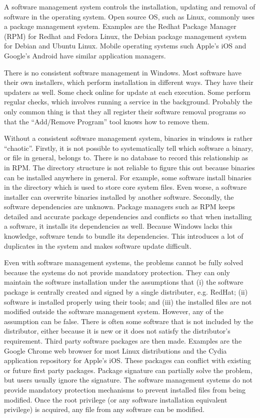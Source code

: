 A software management system controls the installation, updating and
removal of software in the operating system.
Open source OS, such as Linux, commonly uses a package management system.
Examples are the Redhat Package Manager (RPM) for Redhat and Fedora Linux,
the Debian package management system for Debian and Ubuntu Linux.
Mobile operating systems such Apple's iOS and Google's Android have
similar application managers.

There is no consistent software management in Windows.
Most software have their own installers, which perform installation in
different ways.
They have their updaters as well.
Some check online for update at each execution.
Some perform regular checks, which involves running
a service in the background.
Probably the only common thing is that they all register their software
removal programs so that the ``Add/Remove Program'' tool knows
how to remove them.

Without a consistent software management system, binaries in windows
is rather ``chaotic''.
Firstly, it is not possible to systematically tell which software a binary,
or file in general, belongs to.
There is no database to record this relationship as in RPM.
The directory structure is not reliable to figure this out because
binaries can be installed anywhere in general.
For example, some software install binaries in the 
directory which is used to store core system files.
Even worse, a software installer can overwrite binaries installed by another
software.
Secondly, the software dependencies are unknown.
Package managers such as RPM keeps detailed and accurate
package dependencies and conflicts
so that when installing a software, it installs its dependencies as well.
Because Windows lacks this knowledge, software tends to bundle its dependencies.
This introduces a lot of duplicates in the system and makes software
update difficult.

Even with software management systems, the problems cannot be fully solved
because the systems do not provide mandatory protection.
They can only maintain the software installation under the assumptions that
(i) the software package is centrally created and signed by
a single distributer, e.g. RedHat;
(ii) software is installed properly using their tools; and
(iii) the installed files are not modified outside the
software management system.
However, any of the assumption can be false.
There is often some software that is not included by the distributor,
either because it is new or it does not satisfy the distributor's
requirement.
Third party software packages are then made.
Examples are the Google Chrome web browser for most Linux distributions
and the Cydia application repository for Apple's iOS.
These packages can conflict with existing or future first party packages.
Package signature can partially solve the problem, but users usually
ignore the signature.
The software management systems do not provide mandatory protection
mechanisms to prevent installed files from being modified.
Once the root privilege (or any software installation equivalent privilege)
is acquired, any file from any software can be modified.

